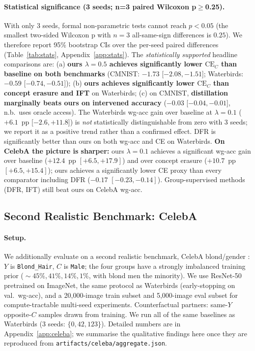 \documentclass{article}
\newcommand{\CE}{\mathrm{CE}}
\begin{document}
\paragraph{Statistical significance (3 seeds; n=3 paired Wilcoxon p$\geq$0.25).}
With only 3 seeds, formal non-parametric tests cannot reach $p<0.05$
(the smallest two-sided Wilcoxon p with $n=3$ all-same-sign differences is
$0.25$).  We therefore report 95\% bootstrap CIs over the per-seed paired
differences (Table~\ref{tab:stats}, Appendix~\ref{app:stats}).  The
\emph{statistically supported} headline comparisons are:
(a) \textbf{ours $\lambda{=}0.5$ achieves significantly lower $\CE_C$ than
baseline on both benchmarks} (CMNIST: $-1.73$ [$-2.08, -1.51$]; Waterbirds:
$-0.59$ [$-0.74, -0.51$]); (b) \textbf{ours achieves significantly lower
$\CE_C$ than concept erasure and IFT} on Waterbirds; (c) on CMNIST,
\textbf{distillation marginally beats ours on intervened accuracy} ($-0.03$
[$-0.04, -0.01$], n.b.\ uses oracle access).  The Waterbirds wg-acc gain over
baseline at $\lambda{=}0.1$ ($+6.1$~pp [$-2.6, +11.8$]) is \emph{not}
statistically distinguishable from zero with 3 seeds; we report it as a
positive trend rather than a confirmed effect.  DFR is significantly better
than ours on both wg-acc and CE on Waterbirds.
\textbf{On CelebA the picture is sharper:} ours $\lambda{=}0.1$ achieves a
significant wg-acc gain over baseline ($+12.4$~pp $[+6.5, +17.9]$) and over
concept erasure ($+10.7$~pp $[+6.5, +15.4]$); ours achieves a significantly
lower CE proxy than every comparator including DFR ($-0.17$ $[-0.23, -0.14]$).
Group-supervised methods (DFR, IFT) still beat ours on CelebA wg-acc.


\subsection{Second Realistic Benchmark: CelebA}
\label{subsec:celeba}

\paragraph{Setup.}
We additionally evaluate on a second realistic benchmark, CelebA blond/gender
\cite{liu2015celeba,sagawa2020dro}: $Y$ is \texttt{Blond\_Hair}, $C$ is
\texttt{Male}; the four groups have a strongly imbalanced training prior
($\!\sim\!45\%, \!41\%, \!14\%, \!1\%$, with blond men the minority).
We use ResNet-50 pretrained on ImageNet, the same protocol as Waterbirds
(early-stopping on val.\ wg-acc), and a 20{,}000-image train subset and
5{,}000-image eval subset for compute-tractable multi-seed experiments.
Counterfactual partners: same-$Y$ opposite-$C$ samples drawn from training.
We run all of the same baselines as Waterbirds (3 seeds: $\{0, 42, 123\}$).
Detailed numbers are in Appendix~\ref{app:celeba}; we summarise the
qualitative findings here once they are reproduced from
\texttt{artifacts/celeba/aggregate.json}.
\end{document}
